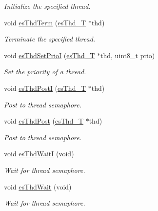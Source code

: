 \begin{DoxyCompactItemize}
\begin{DoxyCompactList}\small\item\em Initialize the specified thread. \end{DoxyCompactList}\item 
void \hyperlink{group__kern__impl_gac9d1eac76f26096614e8196bcfd8b905}{es\-Thd\-Term} (\hyperlink{group__kern__intf_ga62e3a3ca0a4597a19c43cb8868810d82}{es\-Thd\-\_\-\-T} $\ast$thd)
\begin{DoxyCompactList}\small\item\em Terminate the specified thread. \end{DoxyCompactList}\item 
void \hyperlink{group__kern__impl_ga8eaa731d0026a8a1667d4422d5031df6}{es\-Thd\-Set\-Prio\-I} (\hyperlink{group__kern__intf_ga62e3a3ca0a4597a19c43cb8868810d82}{es\-Thd\-\_\-\-T} $\ast$thd, uint8\-\_\-t prio)
\begin{DoxyCompactList}\small\item\em Set the priority of a thread. \end{DoxyCompactList}\item 
void \hyperlink{group__kern__impl_ga1c846f96eb842774a35fb1f8f720a229}{es\-Thd\-Post\-I} (\hyperlink{group__kern__intf_ga62e3a3ca0a4597a19c43cb8868810d82}{es\-Thd\-\_\-\-T} $\ast$thd)
\begin{DoxyCompactList}\small\item\em Post to thread semaphore. \end{DoxyCompactList}\item 
void \hyperlink{group__kern__impl_ga2505a886a7bc006061317a4924651e7c}{es\-Thd\-Post} (\hyperlink{group__kern__intf_ga62e3a3ca0a4597a19c43cb8868810d82}{es\-Thd\-\_\-\-T} $\ast$thd)
\begin{DoxyCompactList}\small\item\em Post to thread semaphore. \end{DoxyCompactList}\item 
void \hyperlink{group__kern__impl_ga6835afa8c355e01dc35a83310770a47c}{es\-Thd\-Wait\-I} (void)
\begin{DoxyCompactList}\small\item\em Wait for thread semaphore. \end{DoxyCompactList}\item 
void \hyperlink{group__kern__impl_gabbe4d89d1eba04a007fc39a9db6a5db9}{es\-Thd\-Wait} (void)
\begin{DoxyCompactList}\small\item\em Wait for thread semaphore. \end{DoxyCompactList}\item 

\end{DoxyCompactItemize}
